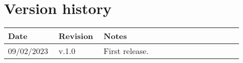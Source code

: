 \chapter*{Version history}

\begin{center}
	\begin{tabular}{@{}p{0.18\linewidth} p{0.18\linewidth} p{0.57\linewidth}@{}}
		\toprule
		\textbf{Date} & \textbf{Revision} & \textbf{Notes}\\
		\midrule
		09/02/2023 & v.1.0 & First release.\\
		\bottomrule
	\end{tabular}
\end{center}